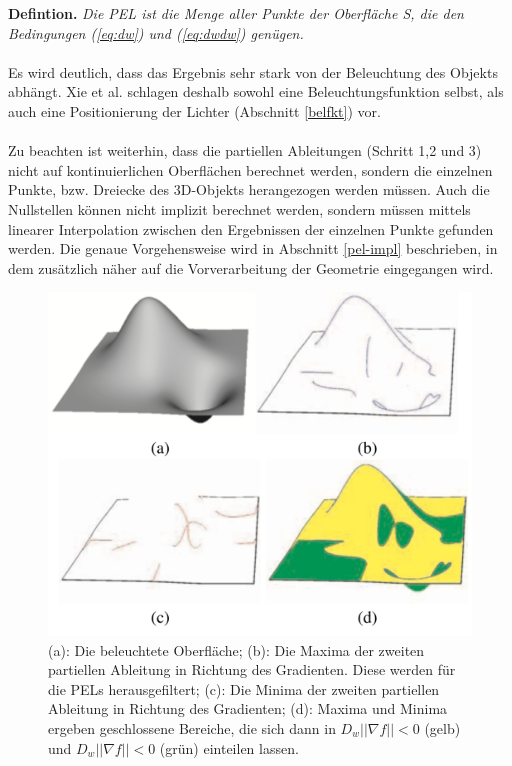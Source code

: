 \documentclass{paperStyle}
\begin{document}
\textbf{Defintion.} \emph{Die PEL ist die Menge aller Punkte der Oberfläche S, die den Bedingungen (\ref{eq:dw}) und (\ref{eq:dwdw}) genügen.}\cite{Xie2007}
\\\\
Es wird deutlich, dass das Ergebnis sehr stark von der Beleuchtung des Objekts abhängt. Xie et al. schlagen deshalb sowohl eine Beleuchtungsfunktion selbst, als auch eine Positionierung der Lichter (Abschnitt \ref{belfkt}) vor.\\\\
Zu beachten ist weiterhin, dass die partiellen Ableitungen (Schritt 1,2 und 3) nicht auf kontinuierlichen Oberflächen berechnet werden, sondern die einzelnen Punkte, bzw. Dreiecke des 3D-Objekts herangezogen werden müssen. Auch die Nullstellen können nicht implizit berechnet werden, sondern müssen mittels linearer Interpolation zwischen den Ergebnissen der einzelnen Punkte gefunden werden. Die genaue Vorgehensweise wird in Abschnitt \ref{pel-impl} beschrieben, in dem zusätzlich näher auf die Vorverarbeitung der Geometrie eingegangen wird.
\begin{figure}
	\centering
		\includegraphics[width=0.7\linewidth]{abcd.png}
	\caption{(a): Die beleuchtete Oberfläche; (b): Die Maxima der zweiten partiellen Ableitung in Richtung des Gradienten. Diese werden für die PELs herausgefiltert; (c): Die Minima der zweiten partiellen Ableitung in Richtung des Gradienten; (d): Maxima und Minima ergeben geschlossene Bereiche, die sich dann in $D_{w}||\nabla f || < 0$ (gelb) und $D_{w}||\nabla f || < 0$ (grün) einteilen lassen.}
	\label{fig:abcd}
\end{figure}
\end{document}
